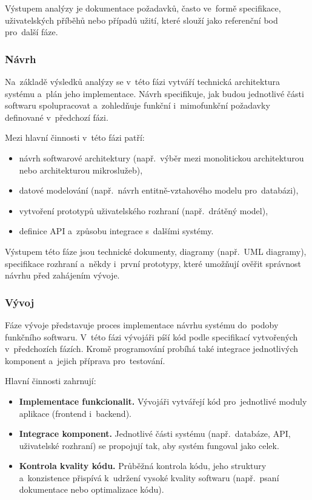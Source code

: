 \documentclass[male,czech,api_bc]{kitheses}
\begin{document}
Výstupem analýzy je dokumentace požadavků, často ve~formě specifikace, uživatelských příběhů nebo případů užití, které slouží jako referenční bod pro~další fáze.

\subsubsection{Návrh}

Na~základě výsledků analýzy se v~této fázi vytváří technická architektura systému a~plán jeho implementace. Návrh specifikuje, jak budou jednotlivé části softwaru spolupracovat a~zohledňuje funkční i~mimofunkční požadavky definované v~předchozí fázi.

Mezi hlavní činnosti v~této fázi patří:
\begin{itemize}
	\item návrh softwarové architektury (např.~výběr mezi monolitickou architekturou nebo architekturou mikroslužeb),
	\item datové modelování (např.~návrh entitně-vztahového modelu pro~databázi),
	\item vytvoření prototypů uživatelského rozhraní (např.~drátěný model),
	\item definice API a~způsobu integrace s~dalšími systémy.
\end{itemize}

Výstupem této fáze jsou technické dokumenty, diagramy (např.~UML diagramy), specifikace rozhraní a~někdy i~první prototypy, které umožňují ověřit správnost návrhu před zahájením vývoje.

\subsubsection{Vývoj}

Fáze vývoje představuje proces implementace návrhu systému do~podoby funkčního softwaru. V~této fázi vývojáři píší kód podle specifikací vytvořených v~předchozích fázích. Kromě programování probíhá také integrace jednotlivých komponent a~jejich příprava pro~testování.

Hlavní činnosti zahrnují:
\begin{itemize}
	\item \textbf{Implementace funkcionalit.} Vývojáři vytvářejí kód pro~jednotlivé moduly aplikace (frontend i~backend).
	\item \textbf{Integrace komponent.} Jednotlivé části systému (např.~databáze, API, uživatelské rozhraní) se propojují tak, aby systém fungoval jako celek.
	\item \textbf{Kontrola kvality kódu.} Průběžná kontrola kódu, jeho struktury a~konzistence přispívá k~udržení vysoké kvality softwaru (např.~psaní dokumentace nebo optimalizace kódu).
\end{itemize}
\end{document}
